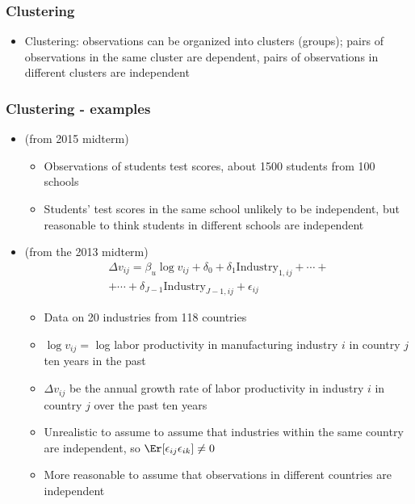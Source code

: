 \begin{frame}[allowframebreaks] 
  \frametitle{Clustering}
  \begin{itemize}
  \item \alert{Clustering}: observations can be organized into clusters
    (groups); pairs of observations in the same cluster are
    dependent, pairs of observations in different clusters are
    independent 
  \end{itemize}
\end{frame}
\begin{frame}[allowframebreaks]
  \frametitle{Clustering - examples}
  \begin{itemize}
  \item \cite{blimpo2014} (from 2015 midterm)
    \begin{itemize}
    \item Observations of students test scores, about 1500 students
      from 100 schools
    \item Students' test scores in the same school unlikely to be independent, but
      reasonable to think students in different schools are
      independent
    \end{itemize}
  \item \cite{rodrik2013} (from the 2013 midterm) 
    \begin{align*}
      \Delta v_{ij} = \beta_u \log v_{ij} + \delta_0 + \delta_1
      \mathrm{Industry}_{1,ij} + \cdots + \\ + \cdots + \delta_{J-1}
      \mathrm{Industry}_{J-1,ij} + \epsilon_{ij} 
    \end{align*}
    \begin{itemize}
    \item Data on 20 industries from 118 countries
    \item $\log v_{ij} = $ log
      labor productivity in manufacturing industry $i$ in country $j$
      ten years in the past 
    \item$\Delta v_{ij}$ be the annual growth rate of
      labor productivity in industry $i$ in country $j$ over the past
      ten years  
    \item Unrealistic to assume to assume that industries within the
      same country are independent, so $\Er[\epsilon_{ij}
      \epsilon_{ik}] \neq 0$
    \item More reasonable to assume that observations in different
      countries are independent
    \end{itemize}
  \end{itemize}
\end{frame}


